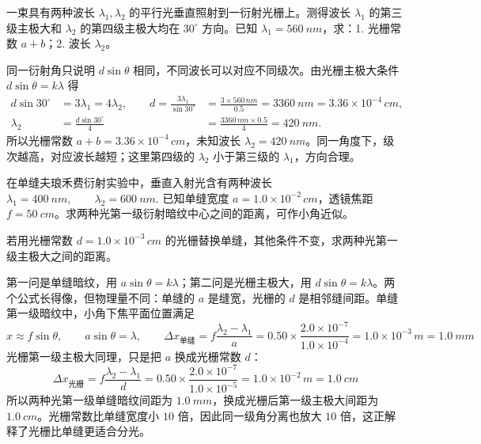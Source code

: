 \documentclass[lang=cn,11pt]{elegantbook}
\begin{document}
\begin{exercise}
一束具有两种波长 \(\lambda_1,\lambda_2\) 的平行光垂直照射到一衍射光栅上。测得波长 \(\lambda_1\) 的第三级主极大和 \(\lambda_2\) 的第四级主极大均在 \(30^\circ\) 方向。已知 \(\lambda_1=\SI{560}{nm}\)，求：1. 光栅常数 \(a+b\)；2. 波长 \(\lambda_2\)。
\end{exercise}

\begin{solution}
同一衍射角只说明 \(d\sin\theta\) 相同，不同波长可以对应不同级次。由光栅主极大条件 \(d\sin\theta=k\lambda\) 得
\[
\begin{aligned}
d\sin30^\circ&=3\lambda_1=4\lambda_2,\qquad
d=\frac{3\lambda_1}{\sin30^\circ}
&=\frac{3\times560\,\si{nm}}{0.5}
=\SI{3360}{nm}=3.36\times10^{-4}\,\si{cm},\\
\lambda_2&=\frac{d\sin30^\circ}{4}
&=\frac{3360\,\si{nm}\times0.5}{4}
=\SI{420}{nm}.
\end{aligned}
\]
所以光栅常数 \(a+b=3.36\times10^{-4}\,\si{cm}\)，未知波长 \(\lambda_2=\SI{420}{nm}\)。同一角度下，级次越高，对应波长越短；这里第四级的 \(\lambda_2\) 小于第三级的 \(\lambda_1\)，方向合理。
\end{solution}

\begin{exercise}[2015-2016期末：单缝暗纹与光栅主极大怎样分开算]
在单缝夫琅禾费衍射实验中，垂直入射光含有两种波长
 \(\lambda_1=\SI{400}{nm},\qquad \lambda_2=\SI{600}{nm}.\) 
已知单缝宽度 \(a=1.0\times10^{-2}\,\si{cm}\)，透镜焦距 \(f=\SI{50}{cm}\)。求两种光第一级衍射暗纹中心之间的距离，可作小角近似。

若用光栅常数 \(d=1.0\times10^{-3}\,\si{cm}\) 的光栅替换单缝，其他条件不变，求两种光第一级主极大之间的距离。
\end{exercise}

\begin{solution}
第一问是单缝暗纹，用 \(a\sin\theta=k\lambda\)；第二问是光栅主极大，用 \(d\sin\theta=k\lambda\)。两个公式长得像，但物理量不同：单缝的 \(a\) 是缝宽，光栅的 \(d\) 是相邻缝间距。单缝第一级暗纹中，小角下焦平面位置满足
 \[x\approx f\sin\theta,\qquad a\sin\theta=\lambda,\qquad \Delta x_{\text{单缝}} =f\frac{\lambda_2-\lambda_1}{a} =0.50\times\frac{2.0\times10^{-7}}{1.0\times10^{-4}} =1.0\times10^{-3}\,\si{m} =\SI{1.0}{mm}\]
光栅第一级主极大同理，只是把 \(a\) 换成光栅常数 \(d\)：
 \[\Delta x_{\text{光栅}} =f\frac{\lambda_2-\lambda_1}{d} =0.50\times\frac{2.0\times10^{-7}}{1.0\times10^{-5}} =1.0\times10^{-2}\,\si{m} =\SI{1.0}{cm}\]
所以两种光第一级单缝暗纹间距为 \(\SI{1.0}{mm}\)，换成光栅后第一级主极大间距为 \(\SI{1.0}{cm}\)。光栅常数比单缝宽度小 \(10\) 倍，因此同一级角分离也放大 \(10\) 倍，这正解释了光栅比单缝更适合分光。
\end{solution}
\end{document}
